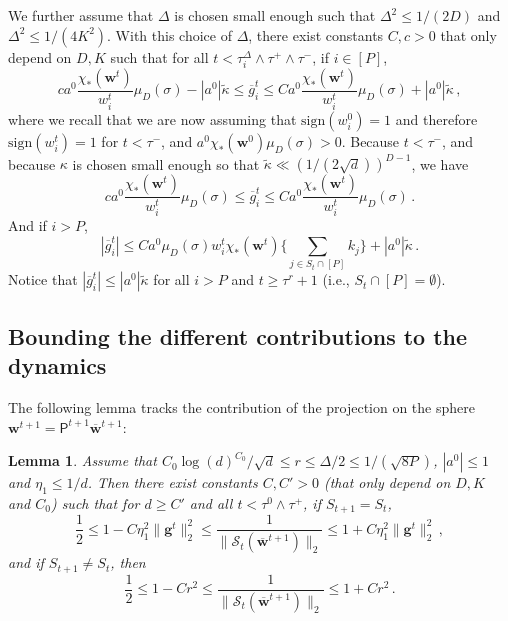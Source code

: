 \documentclass[11pt]{article}
\newcommand{\<}{\langle}
\renewcommand{\>}{\rangle}
\newcommand{\sign}{\text{sign}}
\newtheorem{lemma}{Lemma}
\theoremstyle{definition}
\def\bg{{\boldsymbol g}}
\def\bw{{\boldsymbol w}}
\def\cS{{\mathcal S}}
\def\proj{{\mathsf P}}
\def\proj{{\mathsf P}}
\def\proj{{\mathsf P}}
\def\proj{{\mathsf P}}
\def\proj{{\mathsf P}}
\def\bg{{\boldsymbol g}}
\def\bw{{\boldsymbol w}}
\def\proj{{\mathsf P}}
\def\bg{{\boldsymbol g}}
\def\cS{{\mathcal S}}
\def\bg{{\boldsymbol g}}
\def\og{\overline{g}}
\def\obw{\overline{\bw}}
\begin{document}
We further assume that $\Delta$ is chosen small enough such that $\Delta^2 \leq 1/(2D)$ and $\Delta^2 \leq 1 / (4 K^2)$. With this choice of $\Delta$, there exist constants $C,c > 0$ that only depend on $D,K$ such that for all $t < \tau_i^\Delta \wedge \tau^+ \wedge \tau^-$, if $i \in [P]$,
\[
c a^0 \frac{\chi_* (\bw^t)}{w_i^t} \mu_D (\sigma) - |a^0| \tilde{\kappa} \leq \og_i^t \leq C a^0  \frac{\chi_* (\bw^t)}{w_i^t} \mu_D (\sigma) + |a^0| \tilde{\kappa}\, ,
\]
where we recall that we are now assuming that $\sign (w_i^0) = 1$ and therefore $\sign (w_i^t) =1$ for $t < \tau^-$, and $a^0 \chi_* (\bw^0) \mu_D (\sigma) >0$. Because $t < \tau^{-}$, and because $\kappa$ is chosen small enough so that $\tilde{\kappa} \ll (1/(2\sqrt{d}))^{D-1}$, we have
\begin{equation}\label{eq:og-on-first-P-bounds}
c a^0 \frac{\chi_* (\bw^t)}{w_i^t} \mu_D (\sigma) \leq \og_i^t \leq C a^0  \frac{\chi_* (\bw^t)}{w_i^t} \mu_D (\sigma)\, .
\end{equation}
And if $i >P$,
\[
|\og_i^t| \leq   C a^0 \mu_D (\sigma) w_i^t \chi_* (\bw^t) \Big\{ \sum_{j \in S_t \cap [P]} k_j \Big\} + |a^0| \tilde{\kappa}\, . 
\]
Notice that $|\og_i^t| \leq |a^0| \tilde{\kappa}$ for all $i>P$ and $t \geq \tau^r +1$ (i.e., $S_t \cap [P] = \emptyset$).



\subsection{Bounding the different contributions to the dynamics}
\label{sec:bounding_contributions_dynamics}


The following lemma tracks the contribution of the projection on the sphere $\bw^{t+1} = \proj^{t+1} \obw^{t+1}$:

\begin{lemma}\label{lem:proj_step_bounds}
Assume that $C_0 \log(d)^{C_0}/\sqrt{d} \leq r \leq \Delta /2 \leq 1/(\sqrt{8P})$, $|a^0| \leq 1$ and $\eta_1 \leq 1/d$. Then there exist constants $C, C' >0$ (that only depend on $D, K$ and $C_0$) such that for $d \geq C'$ and all $t < \tau^0 \wedge \tau^+$, if $S_{t+1} = S_t$,
\begin{equation}\label{eq:proj_step_bound_I}
\frac{1}{2} \leq 1 - C \eta_1^2 \|  \bg^t  \|_2^2 \leq \frac{1}{\| \cS_t ( \obw^{t+1} ) \|_2 } \leq 1 + C \eta_1^2 \|  \bg^t  \|_2^2 \, ,
\end{equation}
and if $S_{t+1} \neq S_t$, then
\begin{equation}\label{eq:proj_step_bound_II}
\frac{1}{2} \leq 1 - C r^2 \leq \frac{1}{\| \cS_t ( \obw^{t+1} ) \|_2 }  \leq 1 + Cr^2 \, .
\end{equation}
\end{lemma}
\end{document}
